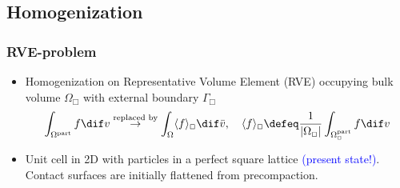 \documentclass[11pt]{beamer} %
\begin{document}
\subsection{Homogenization}
\begin{frame}
 \frametitle{RVE-problem}
\begin{itemize}
 \item Homogenization on Representative Volume Element (RVE) occupying bulk volume $\Omega_\Box$ with external boundary $\Gamma_\Box$
 \begin{align*}
  \int_{\Omega^{\mathrm{part}}} f \dif v \stackrel{\text{replaced by}}{\to} \int_\Omega \langle f\rangle_\Box \dif \bar{v}, \quad \langle f\rangle_\Box \defeq \frac1{|\Omega_\Box|} \int_{\Omega_\Box^{\mathrm{part}}} f \dif v
 \end{align*}
 \item Unit cell in 2D with particles in a perfect square lattice \textcolor{blue}{(present state!)}. Contact surfaces are initially flattened from precompaction.
\end{itemize}
 \begin{center}
  \begin{columns}
   \centering
    \resizebox{!}{0.8\textwidth}{}
  \end{columns}
 \end{center}
\end{frame}
\end{document}
